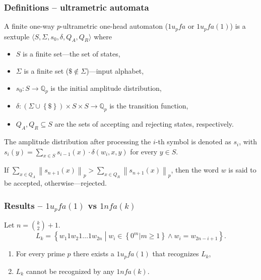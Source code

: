 \documentclass{beamer}
\begin{document}
\begin{frame}
\frametitle{Definitions -- ultrametric automata}
A finite one-way $p$-ultrametric one-head automaton  ($1\mathit{u_pfa}$ or $1\mathit{u_pfa}(1)$) is a sextuple
$\langle S, \Sigma, s_0, \delta, Q_A, Q_R \rangle$ where
\begin{itemize}
  \item $S$ is a finite set---the set of states,
  \item $\Sigma$ is a finite set ($\$ \notin \Sigma$)---input alphabet,
  \item $s_0:S \rightarrow \mathbb{Q}_p$ is the initial amplitude distribution,
  \item $\delta: \left( \Sigma \cup \left\{ \$ \right\} \right) \times S \times S \rightarrow \mathbb{Q}_p$ is the transition function,
  \item $Q_A, Q_R \subseteq S$ are the sets of accepting and rejecting states, respectively.
\end{itemize}

The amplitude distribution after processing the $i$-th symbol is denoted as $s_i$, with
$s_i(y) = \sum_{x \in S}{s_{i-1}(x) \cdot \delta \left( w_i, x, y \right) }$ for every $y \in S$.

If $\sum_{x \in Q_A}{\left\| s_{n+1}(x) \right\|_p} > \sum_{x \in Q_R}{\left\| s_{n+1}(x) \right\|_p}$, then the word $w$ is said to be accepted, otherwise---rejected.

\end{frame}
\begin{frame}
\frametitle{Results -- $1\mathit{u_pfa}(1)$ vs $1\mathit{nfa}(k)$}
Let $n={k\choose 2}+1$.
\[
L_k = \left\{ w_1 1 w_2 1 \ldots 1 w_{2n} \middle|
		w_i \in \left\{ 0^m | m \geq 1 \right\} \wedge
		w_i = w_{2n-i+1} 
		 \right\}.
\]
\begin{theorem}
\begin{enumerate}
	\item For every prime $p$ there exists a $1\mathit{u_pfa}(1)$ that recognizes $L_k$,
	\item $L_k$ cannot be recognized by any $1\mathit{nfa}(k)$.
\end{enumerate}
\end{theorem}
\end{frame}
\end{document}
